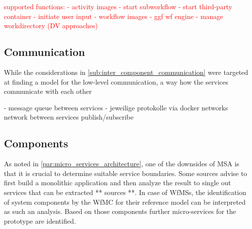 \textcolor{red}{
  supported functions:
    - activity images
      - start subworkflow
      - start third-party container
      - initiate user input
    - workflow images
      - ggf wf engine
      - manage workdirectory (DV approaches)
}

\subsection{Communication} %
  \label{sub:application_level_communication}
  While the considerations in \ref{sub:inter_component_communication} were targeted at finding a model for the low-level communication, a way how the services communicate with each other

  - message queue between services
  - jeweilige protokolle via docker networks network between
  services publish/subscribe






\subsection{Components} %
  \label{sub:components}
  As noted in \ref{par:micro_services_architecture}, one of the downsides of \ac{MSA} is that it is crucial to determine suitable service boundaries. Some sources advise to first build a monolithic application and then analyze the result to single out services that can be extracted ** sources **. In case of \acp{WfMS}, the identification of system components by the \ac{WfMC} for their reference model can be interpreted as such an analysis. Based on those components further micro-services for the prototype are identified.

